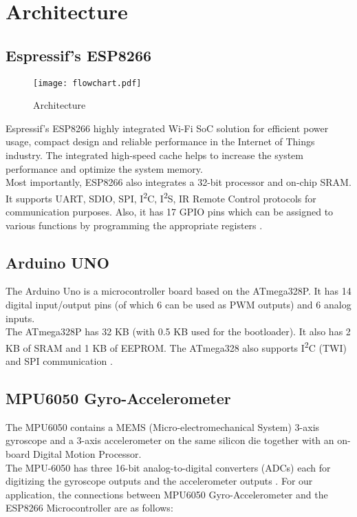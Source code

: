 \documentclass[./main.tex]{subfiles}
\begin{document}
\chapter{Architecture}
\section{Espressif's ESP8266}

\begin{figure}[H]
    \centering
    \texttt{[image: flowchart.pdf]}
    \caption{Architecture}
    \label{fig:architecture}
\end{figure}


Espressif’s ESP8266 highly integrated Wi-Fi SoC solution for efficient power
usage, compact design and reliable performance in the Internet of Things
industry. The integrated high-speed cache helps to increase the system
performance and optimize the system memory. \\ Most importantly, ESP8266 also
integrates a 32-bit processor and on-chip SRAM.  It supports UART, SDIO, SPI,
I\textsuperscript{2}C, I\textsuperscript{2}S, IR Remote Control protocols for
communication purposes.  Also, it has 17 GPIO pins which can be assigned to
various functions by programming the appropriate registers \cite{espdata}.

\section{Arduino UNO}
The Arduino Uno is a microcontroller board based on the ATmega328P. It has 14
digital input/output pins (of which 6 can be used as PWM outputs) and 6 analog
inputs. \\ The ATmega328P has 32 KB (with 0.5 KB used for the bootloader). It
also has 2 KB of SRAM and 1 KB of EEPROM. The ATmega328 also supports
I\textsuperscript{2}C (TWI) and SPI communication \cite{arddata}.

\section{MPU6050 Gyro-Accelerometer}
The MPU6050 contains a MEMS (Micro-electromechanical System) 3-axis gyroscope
and a 3-axis accelerometer on the same silicon die together with an on-board
Digital Motion Processor. \\ The MPU-6050 has three 16-bit analog-to-digital
converters (ADCs) each for digitizing the gyroscope outputs and the
accelerometer outputs \cite{mpudata}. For our application, the connections
between MPU6050 Gyro-Accelerometer and the ESP8266 Microcontroller are as
follows:
\end{document}
